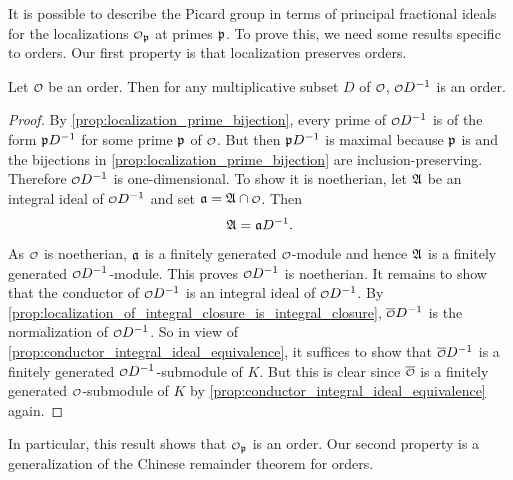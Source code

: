     It is possible to describe the Picard group in terms of principal fractional ideals for the localizations \(\smc{O}_{\mf{p}}\) at primes \(\mathfrak{p}\). To prove this, we need some results specific to orders. Our first property is that localization preserves orders.

    \begin{proposition}\label{prop:localization_preserves_orders}
      Let \(\smc{O}\) be an order. Then for any multiplicative subset \(D\) of \(\smc{O}\), \(\smc{O}D^{-1}\) is an order.
    \end{proposition}
    \begin{proof}
      By \cref{prop:localization_prime_bijection}, every prime of \(\smc{O}D^{-1}\) is of the form \(\mathfrak{p}D^{-1}\) for some prime \(\mathfrak{p}\) of \(\smc{O}\). But then \(\mathfrak{p}D^{-1}\) is maximal because \(\mathfrak{p}\) is and the bijections in \cref{prop:localization_prime_bijection} are inclusion-preserving. Therefore \(\smc{O}D^{-1}\) is one-dimensional. To show it is noetherian, let \(\mathfrak{A}\) be an integral ideal of \(\smc{O}D^{-1}\) and set \(\mf{a} = \mf{A} \cap \smc{O}\). Then
      \[
        \mathfrak{A} = \mathfrak{a}D^{-1}.
      \]
      As \(\smc{O}\) is noetherian, \(\mathfrak{a}\) is a finitely generated \(\smc{O}\)-module and hence \(\mathfrak{A}\) is a finitely generated \(\smc{O}D^{-1}\)-module. This proves \(\smc{O}D^{-1}\) is noetherian. It remains to show that the conductor of \(\smc{O}D^{-1}\) is an integral ideal of \(\smc{O}D^{-1}\). By \cref{prop:localization_of_integral_closure_is_integral_closure}, \(\conj{\smc{O}}D^{-1}\) is the normalization of \(\smc{O}D^{-1}\). So in view of \cref{prop:conductor_integral_ideal_equivalence}, it suffices to show that \(\conj{\smc{O}}D^{-1}\) is a finitely generated \(\smc{O}D^{-1}\)-submodule of \(K\). But this is clear since \(\conj{\smc{O}}\) is a finitely generated \(\smc{O}\)-submodule of \(K\) by \cref{prop:conductor_integral_ideal_equivalence} again.
    \end{proof}
    
    In particular, this result shows that \(\smc{O}_{\mf{p}}\) is an order. Our second property is a generalization of the Chinese remainder theorem for orders. 

